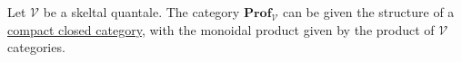 Let $\mathcal{V}$ be a skeltal quantale. The category $\mathbf{Prof}_\mathcal{V}$ can be given the structure of a \href{doc/1 math/Seven Sketches in Compositionality/Chapter 4: Co-design/5 Profunctors form a compact closed category/1 Compact closed categories/2 Compact closed SMC}{compact closed category}, with the monoidal product given by the product of $\mathcal{V}$ categories.